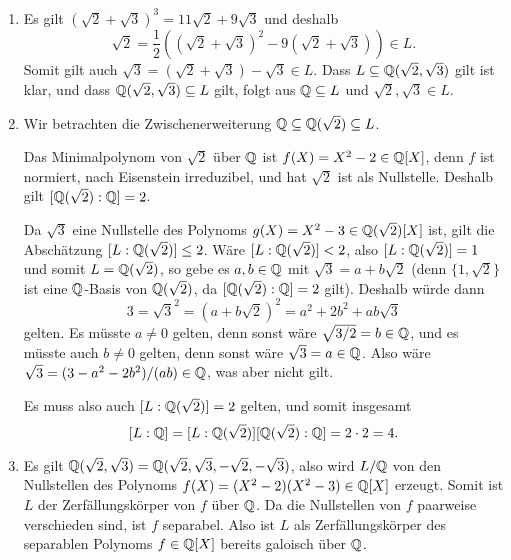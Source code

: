 \begin{solution}
  \begin{enumerate}
    \item
      Es gilt $(\sqrt{2} + \sqrt{3})^3 = 11 \sqrt{2} + 9 \sqrt{3}$ und deshalb
      \[
            \sqrt{2}
        =   \frac{1}{2}\left( (\sqrt{2} + \sqrt{3})^2 - 9(\sqrt{2} + \sqrt{3}) \right)
        \in L.
      \]
      Somit gilt auch $\sqrt{3} = (\sqrt{2} + \sqrt{3}) - \sqrt{3} \in L$.
      Dass $L \subseteq \mathbb{Q}(\sqrt{2}, \sqrt{3})$ gilt ist klar, und dass $\mathbb{Q}(\sqrt{2}, \sqrt{3}) \subseteq L$ gilt, folgt aus $\mathbb{Q} \subseteq L$ und $\sqrt{2}, \sqrt{3} \in L$.
      
    \item
      Wir betrachten die Zwischenerweiterung $\mathbb{Q} \subseteq \mathbb{Q}(\sqrt{2}) \subseteq L$.
      
      Das Minimalpolynom von $\sqrt{2}$ über $\mathbb{Q}$ ist $f(X) = X^2 - 2 \in \mathbb{Q}[X]$, denn $f$ ist normiert, nach Eisenstein irreduzibel, und hat $\sqrt{2}$ ist als Nullstelle.
      Deshalb gilt $[\mathbb{Q}(\sqrt{2}) : \mathbb{Q}] = 2$.
      
      Da $\sqrt{3}$ eine Nullstelle des Polynoms $g(X) = X^2 - 3 \in \mathbb{Q}(\sqrt{2})[X]$ ist, gilt die Abschätzung $[L : \mathbb{Q}(\sqrt{2})] \leq 2$.
      Wäre $[L : \mathbb{Q}(\sqrt{2})] < 2$, also $[L : \mathbb{Q}(\sqrt{2})] = 1$ und somit $L = \mathbb{Q}(\sqrt{2})$, so gebe es $a, b \in \mathbb{Q}$ mit $\sqrt{3} = a + b \sqrt{2}$ (denn $\{1, \sqrt{2}\}$ ist eine $\mathbb{Q}$-Basis von $\mathbb{Q}(\sqrt{2})$, da $[\mathbb{Q}(\sqrt{2}) : \mathbb{Q}] = 2$ gilt).
      Deshalb würde dann
      \[
          3
        = \sqrt{3}^2
        = (a + b \sqrt{2})^2
        = a^2 + 2 b^2 + ab \sqrt{3}
      \]
      gelten.
      Es müsste $a \neq 0$ gelten, denn sonst wäre $\sqrt{3/2} = b \in \mathbb{Q}$, und es müsste auch $b \neq 0$ gelten, denn sonst wäre $\sqrt{3} = a \in \mathbb{Q}$.
      Also wäre $\sqrt{3} = (3 - a^2 - 2b^2)/(ab) \in \mathbb{Q}$, was aber nicht gilt.
      
      Es muss also auch $[L : \mathbb{Q}(\sqrt{2})] = 2$ gelten, und somit insgesamt
      \[
          [L : \mathbb{Q}]
        = [L : \mathbb{Q}(\sqrt{2})] [\mathbb{Q}(\sqrt{2}) : \mathbb{Q}]
        = 2 \cdot 2
        = 4.
      \]
      
    \item
      Es gilt $\mathbb{Q}(\sqrt{2}, \sqrt{3}) = \mathbb{Q}(\sqrt{2}, \sqrt{3}, -\sqrt{2}, -\sqrt{3})$, also wird $L/\mathbb{Q}$ von den Nullstellen des Polynoms $f(X) = (X^2 - 2)(X^2 - 3) \in \mathbb{Q}[X]$ erzeugt.
      Somit ist $L$ der Zerfällungskörper von $f$ über $\mathbb{Q}$.
      Da die Nullstellen von $f$ paarweise verschieden sind, ist $f$ separabel.
      Also ist $L$ als Zerfällungskörper des separablen Polynoms $f \in \mathbb{Q}[X]$ bereits galoisch über $\mathbb{Q}$.
    

\end{enumerate}
\end{solution}
